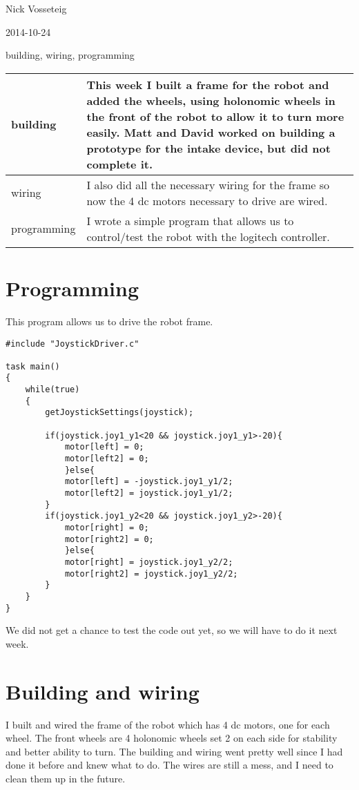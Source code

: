 Nick Vosseteig

2014-10-24

building, wiring, programming

\begin{tabular}{|p{5cm}|p{5cm}|}
 \hline
 building&
This week I built a frame for the robot and added the wheels, using holonomic wheels in the front of the robot to allow it to turn more easily. Matt and David worked on building a prototype for the intake device, but did not complete it. 
 \\
 \hline
wiring&
I also did all the necessary wiring for the frame so now the 4 dc motors necessary to drive are wired.
 \\
 \hline
programming& I wrote a simple program that allows us to control/test the robot with the logitech controller.
 \\
 \hline
\end{tabular}

\section*{Programming}
This program allows us to drive the robot frame.
\begin{lstlisting}[style = RobotC]	
#include "JoystickDriver.c"

task main()
{
	while(true)
	{
		getJoystickSettings(joystick);

		if(joystick.joy1_y1<20 && joystick.joy1_y1>-20){
			motor[left] = 0;
			motor[left2] = 0;
			}else{
			motor[left] = -joystick.joy1_y1/2;
			motor[left2] = joystick.joy1_y1/2;
		}
		if(joystick.joy1_y2<20 && joystick.joy1_y2>-20){
			motor[right] = 0;
			motor[right2] = 0;
			}else{
			motor[right] = joystick.joy1_y2/2;
			motor[right2] = joystick.joy1_y2/2;
		}
	}
}
\end{lstlisting}
We did not get a chance to test the code out yet, so we will have to do it next week.

\section*{Building and wiring}
I built and wired the frame of the robot which has 4 dc motors, one for each wheel. The front wheels are 4 holonomic wheels set 2 on each side for stability and better ability to turn. The building and wiring went pretty well since I had done it before and knew what to do. The wires are still a mess, and I need to clean them up in the future.
